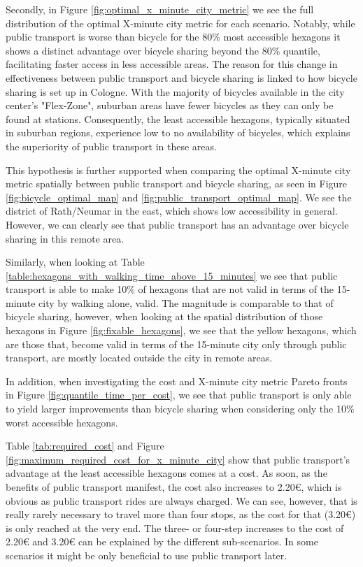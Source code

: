 Secondly, in Figure \ref{fig:optimal_x_minute_city_metric} we see the full distribution of the optimal X-minute city metric for each scenario.
Notably, while public transport is worse than bicycle for the 80\% most accessible hexagons it shows a distinct advantage over bicycle sharing beyond the 80\% quantile, facilitating faster access in less accessible areas. 
The reason for this change in effectiveness between public transport and bicycle sharing is linked to how bicycle sharing is set up in Cologne. 
With the majority of bicycles available in the city center's "Flex-Zone", suburban areas have fewer bicycles as they can only be found at stations.
Consequently, the least accessible hexagons, typically situated in suburban regions, experience low to no availability of bicycles, which explains the superiority of public transport in these areas. 

This hypothesis is further supported when comparing the optimal X-minute city metric spatially between public transport and bicycle sharing, as seen in Figure \ref{fig:bicycle_optimal_map} and \ref{fig:public_transport_optimal_map}.
We see the district of Rath/Neumar in the east, which shows low accessibility in general.
However, we can clearly see that public transport has an advantage over bicycle sharing in this remote area.

Similarly, when looking at Table \ref{table:hexagons_with_walking_time_above_15_minutes} we see that public transport is able to make 10\% of hexagons that are not valid in terms of the 15-minute city by walking alone, valid.
The magnitude is  comparable to that of bicycle sharing, however, when looking at the spatial distribution of those hexagons in Figure \ref{fig:fixable_hexagons}, we see that the yellow hexagons, which are those that, become valid in terms of the 15-minute city only through public transport, are mostly located outside the city in remote areas.

In addition, when investigating the cost and X-minute city metric Pareto fronts in Figure \ref{fig:quantile_time_per_cost}, we see that public transport is only able to yield larger improvements than bicycle sharing when considering only the 10\% worst accessible hexagons.

Table \ref{tab:required_cost} and Figure \ref{fig:maximum_required_cost_for_x_minute_city} show that public transport's advantage at the least accessible hexagons comes at a cost.
As soon, as the benefits of public transport manifest, the cost also increases to 2.20€, which is obvious as public transport rides are always charged.
We can see, however, that is really rarely necessary to travel more than four stops, as the cost for that (3.20€) is only reached at the very end. 
The three- or four-step increases to the cost of 2.20€ and 3.20€ can be explained by the different sub-scenarios.
In some scenarios it might be only beneficial to use public transport later.

